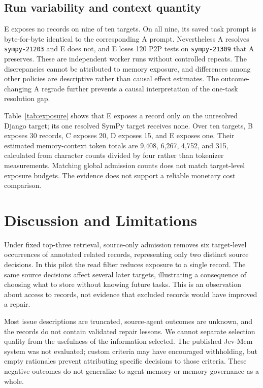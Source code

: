 \documentclass[sigconf,anonymous]{aamas}
\begin{document}
\subsection{Run variability and context quantity}
E exposes no records on nine of ten targets. On all nine, its saved task prompt is byte-for-byte identical to the corresponding A prompt. Nevertheless A resolves \texttt{sympy-21203} and E does not, and E loses 120 P2P tests on \texttt{sympy-21309} that A preserves. These are independent worker runs without controlled repeats. The discrepancies cannot be attributed to memory exposure, and differences among other policies are descriptive rather than causal effect estimates. The outcome-changing A regrade further prevents a causal interpretation of the one-task resolution gap.

Table~\ref{tab:exposure} shows that E exposes a record only on the unresolved Django target; its one resolved SymPy target receives none. Over ten targets, B exposes 30 records, C exposes 20, D exposes 15, and E exposes one. Their estimated memory-context token totals are 9,408, 6,267, 4,752, and 315, calculated from character counts divided by four rather than tokenizer measurements. Matching global admission counts does not match target-level exposure budgets. The evidence does not support a reliable monetary cost comparison.

\section{Discussion and Limitations}
Under fixed top-three retrieval, source-only admission removes six target-level occurrences of annotated related records, representing only two distinct source decisions. In this pilot the read filter reduces exposure to a single record. The same source decisions affect several later targets, illustrating a consequence of choosing what to store without knowing future tasks. This is an observation about access to records, not evidence that excluded records would have improved a repair.

Most issue descriptions are truncated, source-agent outcomes are unknown, and the records do not contain validated repair lessons. We cannot separate selection quality from the usefulness of the information selected. The published Jev-Mem system was not evaluated; custom criteria may have encouraged withholding, but empty rationales prevent attributing specific decisions to those criteria. These negative outcomes do not generalize to agent memory or memory governance as a whole.
\end{document}
